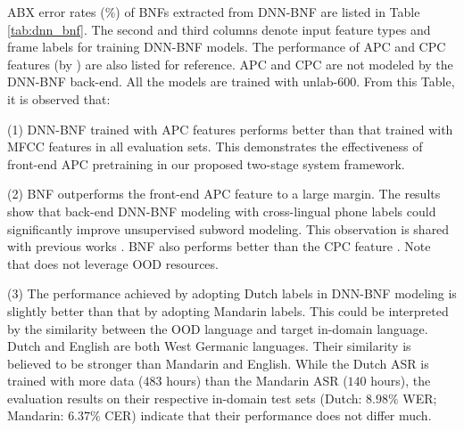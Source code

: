 \documentclass[a4paper]{article}
\begin{document}
ABX error rates (\%) of BNFs extracted from  DNN-BNF are listed in Table \ref{tab:dnn_bnf}. The second and third columns  denote input feature types and frame labels for training DNN-BNF models.
The performance  of    APC  and CPC features (by \cite{kahn2019librilight}) are also listed for reference. {\color{blue}APC and CPC are   not modeled by the DNN-BNF back-end.}
All the models are trained with unlab-600.   From this Table, it is observed  that:

(1) DNN-BNF trained with APC features performs better than that trained with MFCC features in all evaluation sets. This  demonstrates the effectiveness of front-end APC pretraining in our proposed two-stage system framework.

(2) BNF outperforms the front-end APC  feature to a large margin. 
The results show that back-end DNN-BNF modeling with cross-lingual phone labels
could significantly improve unsupervised subword modeling. This observation is shared with previous works \cite{shibata2017composite,feng2019_TASLP}. BNF also performs better than the   CPC feature    \cite{kahn2019librilight}. Note that \cite{kahn2019librilight} does not leverage OOD resources.

(3) The performance achieved by adopting Dutch labels in DNN-BNF modeling is slightly better than that by adopting Mandarin labels. 
This could be interpreted by the similarity between the OOD language and target in-domain language. Dutch and English are both West Germanic languages. Their similarity is believed to be stronger than Mandarin and English. While the Dutch ASR  is trained with more data ($483$ hours) than the Mandarin ASR ($140$ hours), the evaluation results on their respective in-domain test sets (Dutch: $8.98\%$ WER; Mandarin: $6.37\%$ CER) indicate that their performance does not differ much.



\end{document}

